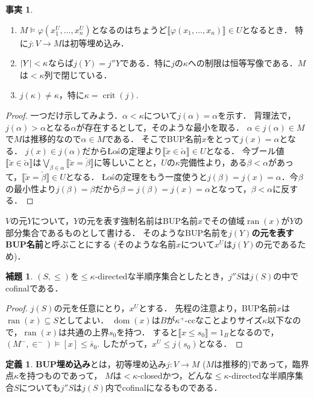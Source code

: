 \documentclass[uplatex,dvipdfmx]{jsarticle}
\newcommand{\range}{\operatorname{ran}}
\newcommand{\dom}{\operatorname{dom}}
\newcommand{\crit}{\operatorname{crit}}
\DeclarePairedDelimiter\abs{\lvert}{\rvert}
\newcommand{\truth}[1]{\llbracket #1 \rrbracket}
\renewcommand\subset{\subseteq}
\theoremstyle{definition}
\newtheorem{defi}[thm]{定義}
\newtheorem{lem}[thm]{補題}
\newtheorem{fact}[thm]{事実}
\begin{document}
	\begin{fact}
	\begin{enumerate}
		\item $M \models \varphi(x_1^U, \dots, x_n^U)$となるのはちょうど$\truth{\varphi(x_1, \dots, x_n)} \in U$となるとき．
		特に$j \colon V \to M$は初等埋め込み．
		\item $\abs{Y} < \kappa$ならば$j(Y) = j''Y$である．特に$j$の$\kappa$への制限は恒等写像である．$M$は${<}\kappa$列で閉じている．
		\item $j(\kappa) \ne \kappa$，特に$\kappa = \crit(j)$.
	\end{enumerate}
	\end{fact}
	\begin{proof}
		一つだけ示してみよう．$\alpha < \kappa$について$j(\alpha) = \alpha$を示す．
		背理法で，$j(\alpha) > \alpha$となる$\alpha$が存在するとして，そのような最小を取る．
		$\alpha \in j(\alpha) \in M$で$M$は推移的なので$\alpha \in M$である．
		そこでBUP名前$x$をとって$j(x) = \alpha$となる．
		$j(x) \in j(\alpha)$だからŁośの定理より$\truth{\check{x} \in \check{\alpha}} \in U$となる．
		今ブール値$\truth{\check{x} \in \check{\alpha}}$は$\bigvee_{\beta \in \alpha} \truth{\check{x} = \check{\beta}}$に等しいことと，$U$の$\kappa$完備性より，ある$\beta < \alpha$があって，$\truth{\check{x} = \check{\beta}} \in U$となる．
		Łośの定理をもう一度使うと$j(\beta) = j(x) = \alpha$．今$\beta$の最小性より$j(\beta) = \beta$だから$\beta = j(\beta) = j(x) = \alpha$となって，$\beta < \alpha$に反する．
	\end{proof}

	$V$の元$Y$について，$Y$の元を表す強制名前はBUP名前$x$でその値域$\range(x)$が$Y$の部分集合であるものとして書ける．
	そのようなBUP名前を\textbf{$j(Y)$の元を表すBUP名前}と呼ぶことにする (そのような名前$x$について$x^U$は$j(Y)$の元であるため)．

	\begin{lem}
		$(S, \le)$を${\le} \kappa$-directedな半順序集合としたとき，$j''S$は$j(S)$の中でcofinalである．
	\end{lem}
	\begin{proof}
		$j(S)$の元を任意にとり，$x^U$とする．
		先程の注意より，BUP名前$x$は$\range(x) \subset S$としてよい．
		$\dom(x)$は$B$が$\kappa^+$-ccなことよりサイズ$\kappa$以下なので，$\range(x)$は共通の上界$s_0$を持つ．
		すると$\truth{x \le s_0} = 1_B$となるので，$(M^-, \in^-) \models [x] \le \check{s_0}$.
		したがって，$x^U \le j(s_0)$となる．
	\end{proof}

	\begin{defi}
		\textbf{BUP埋め込み}とは，初等埋め込み$j \colon V \to M$ ($M$は推移的)であって，臨界点$\kappa$を持つものであって，
		$M$は${<}\kappa$-closedかつ，どんな${\le}\kappa$-directedな半順序集合$S$についても$j''S$は$j(S)$内でcofinalになるものである．
	\end{defi}
\end{document}
